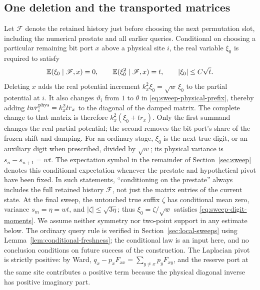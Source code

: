 \subsection{One deletion and the transported matrices}

Let $\mathscr F$ denote the retained history just before choosing the
next permutation slot, including the numerical prestate and all earlier
queries. Conditional on choosing a particular remaining bit port $x$
above a physical site $i$, the real variable $\xi_0$ is required to satisfy
\begin{equation}\label{eq:sweep-digit-moments}
 \mathbb E(\xi_0\mid\mathscr F,x)=0,\qquad
 \mathbb E(\xi_0^2\mid\mathscr F,x)=t,\qquad |\xi_0|\le C\sqrt t.
\end{equation}
Deleting $x$ adds the real potential increment $k_x^2\xi_0=\sqrt w\,\xi_0$ to the
partial potential at $i$. It also changes $\vartheta_i$ from $1$ to
$\theta$ in \eqref{eq:sweep-physical-prefix}, thereby adding
$tw r_i^{\rm phys}=k_x^2tr_x$ to the diagonal of the damped matrix.
The complete change to that matrix is therefore
$k_x^2(\xi_0+tr_x)$. Only the first summand changes the real partial
potential; the second removes the bit port's share of the frozen shift
and damping.
For an ordinary stage, $\xi_0$ is the next true digit, or an auxiliary
digit when prescribed, divided by $\sqrt w$; its physical variance is
$s_n-s_{n+1}=wt$. The expectation symbol in the remainder of
Section~\ref{sec:sweep} denotes this conditional expectation whenever
the prestate and hypothetical pivot have been fixed. In such statements,
``conditioning on the prestate'' always includes the full retained
history $\mathscr F$, not just the matrix entries of the current state.
At the final sweep, the untouched true suffix $\zeta$ has conditional
mean zero, variance $s_m=\eta=wt$, and $|\zeta|\le\sqrt{3\eta}$;
thus $\xi_0=\zeta/\sqrt w$ satisfies
\eqref{eq:sweep-digit-moments}. We assume neither symmetry nor two-point
support in any estimate below. The ordinary query rule is verified in
Section~\ref{sec:local-sweeps} using Lemma~\ref{lem:conditional-freshness};
the conditional law is an input here, and no conclusion conditions on
future success of the construction.
The Laplacian pivot is strictly positive: by Ward,
$q_x-p_xF_{xx}=\sum_{y\ne x}p_yF_{xy}$, and the reserve port at the
same site contributes a positive term because the physical diagonal
inverse has positive imaginary part.

